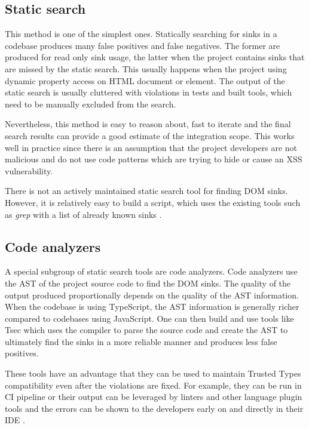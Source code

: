 \subsection{Static search}

This method is one of the simplest ones. Statically searching for sinks in a codebase produces many
false positives and false negatives. The former are produced for read only sink usage, the latter
when the project contains sinks that are missed by the static search. This usually happens when the
project using dynamic property access on HTML document or element. The output of the static search
is usually cluttered with violations in tests and built tools, which need to be manually excluded
from the search.

Nevertheless, this method is easy to reason about, fast to iterate and the final search results can
provide a good estimate of the integration scope. This works well in practice since there is an
assumption that the project developers are not malicious and do not use code patterns which are
trying to hide or cause an XSS vulnerability.

There is not an actively maintained static search tool for finding DOM sinks. However, it is
relatively easy to build a script, which uses the existing tools such as \emph{grep} with a list
of already known sinks \cite{xss_sink_finder}.

\subsection{Code analyzers}

A special subgroup of static search tools are code analyzers. Code analyzers use the AST of the
project source code to find the DOM sinks. The quality of the output produced proportionally depends
on the quality of the AST information. When the codebase is using TypeScript, the AST information is
generally richer compared to codebases using JavaScript. One can then build and use tools like Tsec
\cite{tsec_github} which uses the compiler to parse the source code and create the AST to ultimately
find the sinks in a more reliable manner and produces less false positives.

These tools have an advantage that they can be used to maintain Trusted Types compatibility even
after the violations are fixed. For example, they can be run in CI pipeline or their output can be
leveraged by linters and other language plugin tools and the errors can be shown to the developers
early on and directly in their IDE \cite{tsec_lsp}.

